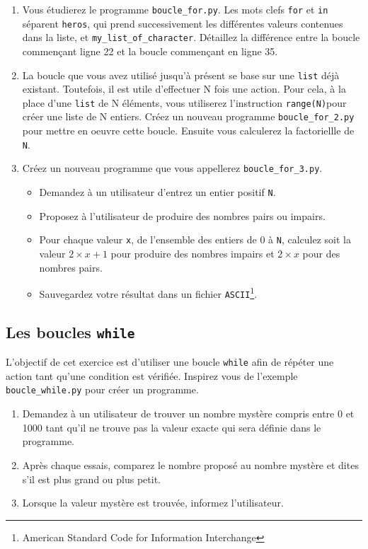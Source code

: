 \begin{enumerate}
\item Vous étudierez le programme \texttt{boucle\_for.py}.
  Les mots clefs \texttt{for} et \texttt{in} séparent \texttt{heros}, qui prend successivement
  les différentes valeurs contenues dans la liste, et \texttt{my\_list\_of\_character}.
  Détaillez la différence entre la boucle commençant ligne 22 et la boucle commençant en ligne 35.

\item La boucle que vous avez utilisé jusqu'à présent se base sur une \texttt{list} déjà existant.
  Toutefois, il est utile d'effectuer N fois une action. Pour cela, à la place d'une \texttt{list} de N
  éléments, vous utiliserez l'instruction \texttt{range(N)}pour créer une liste de N entiers.
  Créez un nouveau programme \texttt{boucle\_for\_2.py} pour mettre en oeuvre cette boucle.
  Ensuite vous calculerez la factoriellle de \texttt{N}.

\item Créez un nouveau programme que vous appellerez \texttt{boucle\_for\_3.py}.
  \begin{itemize}
  \item Demandez à un utilisateur d'entrez un entier positif \texttt{N}.
  \item Proposez à l'utilisateur de produire des nombres pairs ou impairs.
  \item Pour chaque valeur \texttt{x}, de l'ensemble des entiers de 0 à \texttt{N},
    calculez soit la valeur $2\times x+1$ pour produire des nombres impairs et $2\times x$ pour des nombres pairs.
  \item Sauvegardez votre résultat dans un fichier \texttt{ASCII}\footnote{American Standard Code for Information Interchange}.
  \end{itemize}

\end{enumerate}




\subsection{Les boucles \texttt{while}}

L'objectif de cet exercice est d'utiliser une boucle \texttt{while} afin de répéter une action
tant qu'une condition est vérifiée.
Inspirez vous de l'exemple \texttt{boucle\_while.py} pour créer un programme.

\begin{enumerate}
\item Demandez à un utilisateur de trouver un nombre mystère compris entre 0 et 1000 tant qu'il ne trouve pas
  la valeur exacte qui sera définie dans le programme.

\item Après chaque essais, comparez le nombre proposé au nombre mystère et dites s'il est plus grand ou plus petit.

\item Lorsque la valeur mystère est trouvée, informez l'utilisateur.

\end{enumerate}



